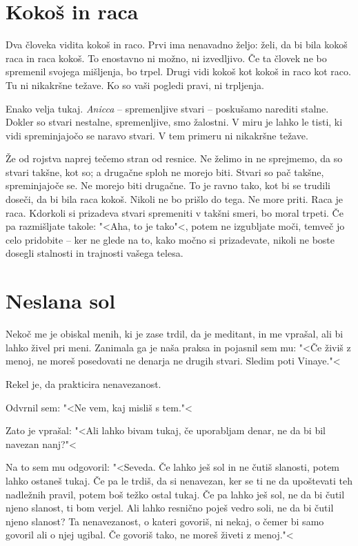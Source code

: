 \section{Kokoš in raca}

Dva človeka vidita kokoš in raco. Prvi ima nenavadno željo: želi, da bi bila kokoš raca in raca kokoš. To enostavno ni možno, ni izvedljivo. Če ta človek ne bo spremenil svojega mišljenja, bo trpel. Drugi vidi kokoš kot kokoš in raco kot raco. Tu ni nikakršne težave. Ko so vaši pogledi pravi, ni trpljenja.

Enako velja tukaj. \emph{Anicca} – spremenljive stvari – poskušamo narediti stalne. Dokler so stvari nestalne, spremenljive, smo žalostni. V miru je lahko le tisti, ki vidi spreminjajočo se naravo stvari. V tem primeru ni nikakršne težave.

Že od rojstva naprej tečemo stran od resnice. Ne želimo in ne sprejmemo, da so stvari takšne, kot so; a drugačne sploh ne morejo biti. Stvari so pač takšne, spreminjajoče se. Ne morejo biti drugačne. To je ravno tako, kot bi se trudili doseči, da bi bila raca kokoš. Nikoli ne bo prišlo do tega. Ne more priti. Raca je raca. Kdorkoli si prizadeva stvari spremeniti v takšni smeri, bo moral trpeti. Če pa razmišljate takole: "<Aha, to je tako"<, potem ne izgubljate moči, temveč jo celo pridobite – ker ne glede na to, kako močno si prizadevate, nikoli ne boste dosegli stalnosti in trajnosti vašega telesa.

\section{Neslana sol}

Nekoč me je obiskal menih, ki je zase trdil, da je meditant, in me vprašal, ali bi lahko živel pri meni. Zanimala ga je naša praksa in pojasnil sem mu: "<Če živiš z menoj, ne moreš posedovati ne denarja ne drugih stvari. Sledim poti Vinaye."<

Rekel je, da prakticira nenavezanost.

Odvrnil sem: "<Ne vem, kaj misliš s tem."<

Zato je vprašal: "<Ali lahko bivam tukaj, če uporabljam denar, ne da bi bil navezan nanj?"<

Na to sem mu odgovoril: "<Seveda. Če lahko ješ sol in ne čutiš slanosti, potem lahko ostaneš tukaj. Če pa le trdiš, da si nenavezan, ker se ti ne da upoštevati teh nadležnih pravil, potem boš težko ostal tukaj. Če pa lahko ješ sol, ne da bi čutil njeno slanost, ti bom verjel. Ali lahko resnično poješ vedro soli, ne da bi čutil njeno slanost? Ta nenavezanost, o kateri govoriš, ni nekaj, o čemer bi samo govoril ali o njej ugibal. Če govoriš tako, ne moreš živeti z menoj."<

